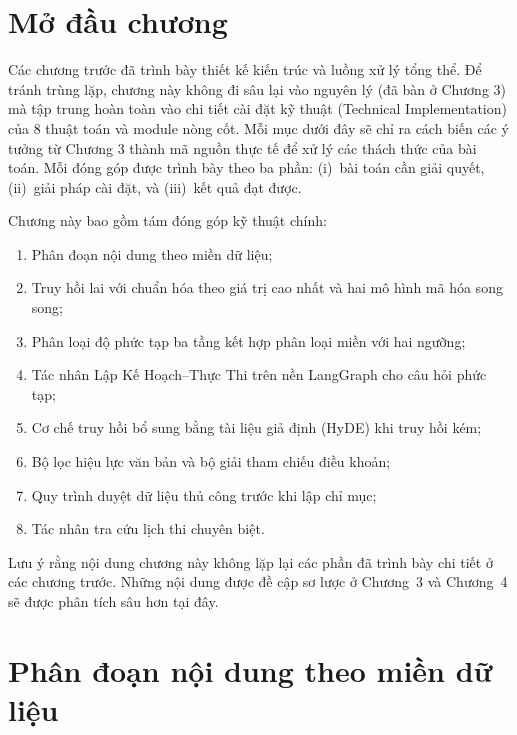 \documentclass[../DoAn.tex]{subfiles}
\begin{document}
\section{Mở đầu chương}

Các chương trước đã trình bày thiết kế kiến trúc và luồng xử lý tổng thể. Để tránh trùng lặp, chương này không đi sâu lại vào nguyên lý (đã bàn ở Chương 3) mà tập trung hoàn toàn vào chi tiết cài đặt kỹ thuật (Technical Implementation) của 8 thuật toán và module nòng cốt. Mỗi mục dưới đây sẽ chỉ ra cách biến các ý tưởng từ Chương 3 thành mã nguồn thực tế để xử lý các thách thức của bài toán.
Mỗi đóng góp được trình bày theo ba phần: (i)~bài toán cần giải quyết,
(ii)~giải pháp cài đặt, và (iii)~kết quả đạt được.

Chương này bao gồm tám đóng góp kỹ thuật chính:
\begin{enumerate}
    \item Phân đoạn nội dung theo miền dữ liệu;
    \item Truy hồi lai với chuẩn hóa theo giá trị cao nhất và hai mô hình mã hóa song song;
    \item Phân loại độ phức tạp ba tầng kết hợp phân loại miền với hai ngưỡng;
    \item Tác nhân Lập Kế Hoạch--Thực Thi trên nền LangGraph cho câu hỏi phức tạp;
    \item Cơ chế truy hồi bổ sung bằng tài liệu giả định (HyDE) khi truy hồi kém;
    \item Bộ lọc hiệu lực văn bản và bộ giải tham chiếu điều khoản;
    \item Quy trình duyệt dữ liệu thủ công trước khi lập chỉ mục;
    \item Tác nhân tra cứu lịch thi chuyên biệt.
\end{enumerate}

Lưu ý rằng nội dung chương này không lặp lại các phần đã trình bày chi tiết ở
các chương trước. Những nội dung được đề cập sơ lược ở Chương~3 và Chương~4 sẽ
được phân tích sâu hơn tại đây.

\section{Phân đoạn nội dung theo miền dữ liệu}
\label{sec:ch5-chunking}
\end{document}
